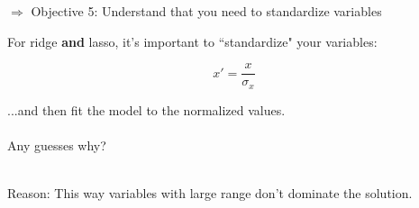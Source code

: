 \documentclass[mathserif, aspectratio=169]{beamer}
\begin{document}
\begin{frame}{$\Rightarrow$ Objective 5: Understand that you need to standardize variables}

For ridge \textbf{and} lasso, it's important to ``standardize" your variables:

\begin{equation}
x' = \frac{x}{\sigma_x}
\end{equation}

...and then fit the model to the normalized values.  \\~\\

Any guesses why?\\~\\

\pause

Reason: This way variables with large range don't dominate the solution.  

\end{frame}
\end{document}
